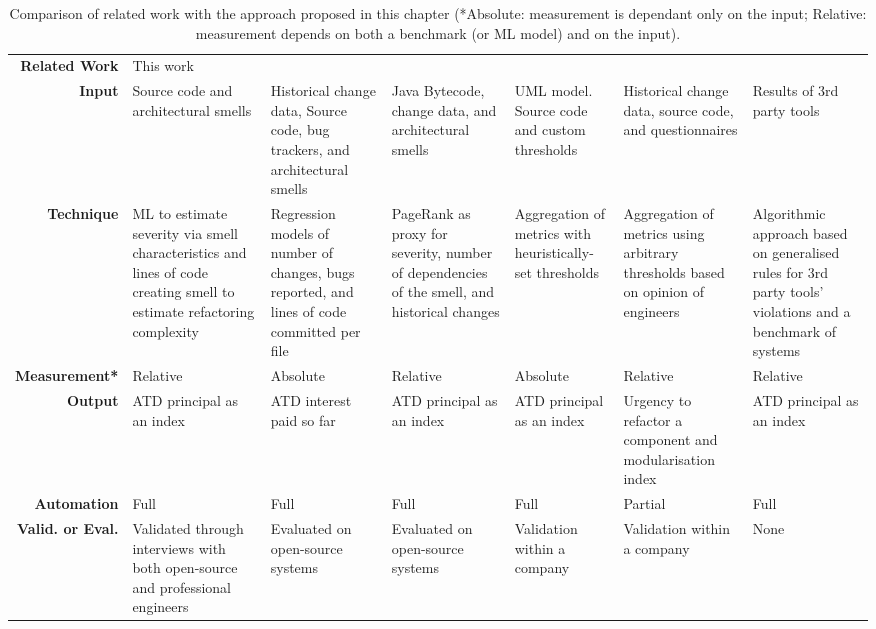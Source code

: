 \begin{sidewaystable}[]
    \scriptsize
    \centering
    \caption{Comparison of related work with the approach proposed in this chapter (*Absolute: measurement is dependant only on the input; Relative: measurement depends on both a benchmark (or ML model) and on the input).}
    \label{c6:tab:rw-comparison}
    \begin{tabular}{r|m{2.5cm}m{2.5cm}m{2cm}m{2cm}m{2cm}m{2cm}}
    \hline
    \textbf{Related Work} & This work & \cite{Xiao2016} & \cite{Roveda2018} & \cite{Martini2018b} & \cite{Wu2018} & \cite{Verdecchia2020} \\
    \textbf{Input} & Source code and architectural smells & Historical change data, Source code, bug trackers, and architectural smells & Java Bytecode, change data, and architectural smells & UML model. Source code and custom thresholds & Historical change data, source code, and questionnaires & Results of 3rd party tools \\
    \textbf{Technique} & ML to estimate severity via smell characteristics and lines of code creating smell to estimate refactoring complexity & Regression models of number of changes, bugs reported, and lines of code committed per file & PageRank as proxy for severity, number of dependencies of the smell, and historical changes & Aggregation of metrics with heuristically-set thresholds & Aggregation of metrics using arbitrary thresholds based on opinion of engineers & Algorithmic approach based on generalised rules for 3rd party tools' violations and a benchmark of systems \\
    \textbf{Measurement*} & Relative & Absolute & Relative & Absolute & Relative & Relative \\
    \textbf{Output} & ATD principal as an index & ATD interest paid so far & ATD principal as an index & ATD principal as an index & Urgency to refactor a component and modularisation index & ATD principal as an index \\
    \textbf{Automation} & Full & Full & Full & Full & Partial & Full \\
    \textbf{Valid. or Eval.} & Validated through interviews with both open-source and professional engineers & Evaluated on open-source systems & Evaluated on open-source systems & Validation within a company & Validation within a company & None \\ \hline
    \end{tabular}
\end{sidewaystable}

